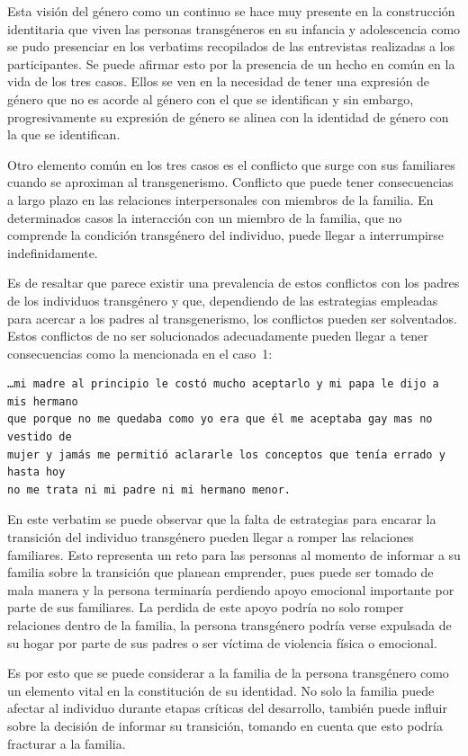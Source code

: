 Esta visión del género como un continuo se hace muy presente en la construcción
identitaria que viven las personas transgéneros en su infancia y adolescencia
como se pudo presenciar en los verbatims recopilados de las entrevistas
realizadas a los participantes. Se puede afirmar esto por la presencia de un
hecho en común en la vida de los tres casos. Ellos se ven en la necesidad de
tener una expresión de género que no es acorde al género con el que se
identifican y sin embargo, progresivamente su expresión de género se alinea con
la identidad de género con la que se identifican.

Otro elemento común en los tres casos es el conflicto que surge
con sus familiares cuando se aproximan al transgenerismo. Conflicto que
puede tener consecuencias a largo plazo en las relaciones interpersonales con
miembros de la familia. En determinados casos la interacción con un
miembro de la familia, que no comprende la condición transgénero del individuo,
puede llegar a interrumpirse indefinidamente.

Es de resaltar que parece existir una prevalencia de estos conflictos con los
padres de los individuos transgénero y que, dependiendo de las estrategias
empleadas para acercar a los padres al transgenerismo, los conflictos pueden ser
solventados. Estos conflictos de no ser solucionados adecuadamente pueden llegar
a tener consecuencias como la mencionada en el caso~1:

\begin{verbatim}
…mi madre al principio le costó mucho aceptarlo y mi papa le dijo a mis hermano
que porque no me quedaba como yo era que él me aceptaba gay mas no vestido de
mujer y jamás me permitió aclararle los conceptos que tenía errado y hasta hoy
no me trata ni mi padre ni mi hermano menor.
\end{verbatim}

En este verbatim se puede observar que la falta de estrategias para encarar la
transición del individuo transgénero pueden llegar a romper las relaciones
familiares. Esto representa un reto para las personas al momento de informar a
su familia sobre la transición que planean emprender, pues puede ser tomado de
mala manera y la persona terminaría perdiendo apoyo emocional importante por
parte de sus familiares. La perdida de este apoyo podría no solo
romper relaciones dentro de la familia, la persona transgénero podría verse
expulsada de su hogar por parte de sus padres o ser víctima de violencia física
o emocional.

Es por esto que se puede considerar a la familia de la persona transgénero como
un elemento vital en la constitución de su identidad. No solo la familia puede
afectar al individuo durante etapas críticas del desarrollo, también puede
influir sobre la decisión de informar su transición, tomando en cuenta que esto
podría fracturar a la familia.

